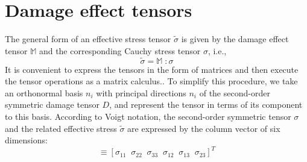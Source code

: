 \documentclass[12pt,twoside]{report}
\begin{document}
\section{Damage effect tensors}\label{Matrix Representation of Damage effect tensors}
\indent\indent\indent The general form of an effective stress tensor $\tilde{\sigma}$ is given by the damage effect tensor $\mathbb{M}$ and the corresponding Cauchy stress tensor $\sigma$, i.e.,
\begin{equation}
\tilde{\sigma}  = \mathbb{M} \; :  \sigma 
\label{eqn:effective_stress_tensor} 
\end{equation}
It is convenient to express the tensors in the form of matrices and then execute the tensor operations as a matrix calculus.. To simplify this procedure, we take an orthonormal basis ${n_{i}}$ with principal directions $n_{i}$ of the second-order symmetric damage tensor $D$, and represent the tensor in terms of its component to this basis. According to Voigt notation, the second-order symmetric tensor $\sigma$ and the related effective stress $\tilde{\sigma}$ are expressed by the column vector of six dimensions:
\begin{equation}
   [\sigma_{P}]  \equiv  [\sigma_{11} \;\; \sigma_{22} \;\;\sigma_{33} \;\;\sigma_{12} \;\;\sigma_{13} \;\;\sigma_{23} ]^{T}
\end{equation}
\end{document}

